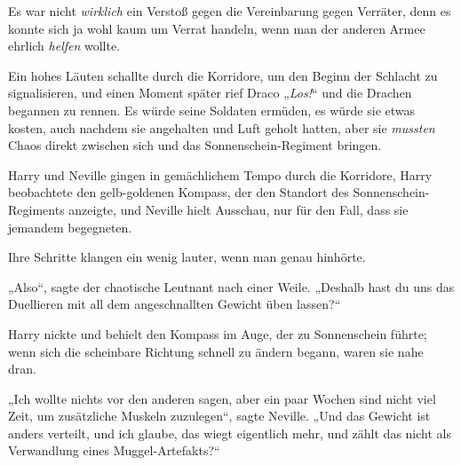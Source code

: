 Es war nicht \emph{wirklich} ein Verstoß gegen die Vereinbarung gegen Verräter, denn es konnte sich ja wohl kaum um Verrat handeln, wenn man der anderen Armee ehrlich \emph{helfen} wollte.

Ein hohes Läuten schallte durch die Korridore, um den Beginn der Schlacht zu signalisieren, und einen Moment später rief Draco „\emph{Los!}“ und die Drachen begannen zu rennen. Es würde seine Soldaten ermüden, es würde sie etwas kosten, auch nachdem sie angehalten und Luft geholt hatten, aber sie \emph{mussten} Chaos direkt zwischen sich und das Sonnenschein-Regiment bringen.

\later

Harry und Neville gingen in gemächlichem Tempo durch die Korridore, Harry beobachtete den gelb-goldenen Kompass, der den Standort des Sonnenschein-Regiments anzeigte, und Neville hielt Ausschau, nur für den Fall, dass sie jemandem begegneten.

Ihre Schritte klangen ein wenig lauter, wenn man genau hinhörte.

„Also“, sagte der chaotische Leutnant nach einer Weile. „Deshalb hast du uns das Duellieren mit all dem angeschnallten Gewicht üben lassen?“

Harry nickte und behielt den Kompass im Auge, der zu Sonnenschein führte; wenn sich die scheinbare Richtung schnell zu ändern begann, waren sie nahe dran.

„Ich wollte nichts vor den anderen sagen, aber ein paar Wochen sind nicht viel Zeit, um zusätzliche Muskeln zuzulegen“, sagte Neville. „Und das Gewicht ist anders verteilt, und ich glaube, das wiegt eigentlich mehr, und zählt das nicht als Verwandlung eines Muggel-Artefakts?“

